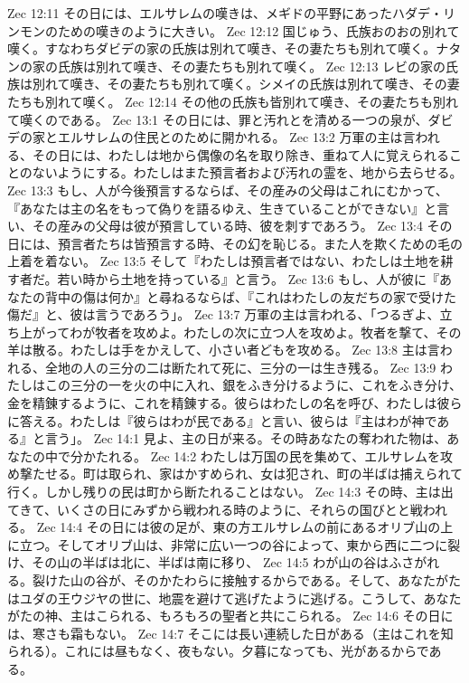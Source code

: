 Zec 12:11  その日には、エルサレムの嘆きは、メギドの平野にあったハダデ・リンモンのための嘆きのように大きい。
Zec 12:12  国じゅう、氏族おのおの別れて嘆く。すなわちダビデの家の氏族は別れて嘆き、その妻たちも別れて嘆く。ナタンの家の氏族は別れて嘆き、その妻たちも別れて嘆く。
Zec 12:13  レビの家の氏族は別れて嘆き、その妻たちも別れて嘆く。シメイの氏族は別れて嘆き、その妻たちも別れて嘆く。
Zec 12:14  その他の氏族も皆別れて嘆き、その妻たちも別れて嘆くのである。
Zec 13:1  その日には、罪と汚れとを清める一つの泉が、ダビデの家とエルサレムの住民とのために開かれる。
Zec 13:2  万軍の主は言われる、その日には、わたしは地から偶像の名を取り除き、重ねて人に覚えられることのないようにする。わたしはまた預言者および汚れの霊を、地から去らせる。
Zec 13:3  もし、人が今後預言するならば、その産みの父母はこれにむかって、『あなたは主の名をもって偽りを語るゆえ、生きていることができない』と言い、その産みの父母は彼が預言している時、彼を刺すであろう。
Zec 13:4  その日には、預言者たちは皆預言する時、その幻を恥じる。また人を欺くための毛の上着を着ない。
Zec 13:5  そして『わたしは預言者ではない、わたしは土地を耕す者だ。若い時から土地を持っている』と言う。
Zec 13:6  もし、人が彼に『あなたの背中の傷は何か』と尋ねるならば、『これはわたしの友だちの家で受けた傷だ』と、彼は言うであろう」。
Zec 13:7  万軍の主は言われる、「つるぎよ、立ち上がってわが牧者を攻めよ。わたしの次に立つ人を攻めよ。牧者を撃て、その羊は散る。わたしは手をかえして、小さい者どもを攻める。
Zec 13:8  主は言われる、全地の人の三分の二は断たれて死に、三分の一は生き残る。
Zec 13:9  わたしはこの三分の一を火の中に入れ、銀をふき分けるように、これをふき分け、金を精錬するように、これを精錬する。彼らはわたしの名を呼び、わたしは彼らに答える。わたしは『彼らはわが民である』と言い、彼らは『主はわが神である』と言う」。
Zec 14:1  見よ、主の日が来る。その時あなたの奪われた物は、あなたの中で分かたれる。
Zec 14:2  わたしは万国の民を集めて、エルサレムを攻め撃たせる。町は取られ、家はかすめられ、女は犯され、町の半ばは捕えられて行く。しかし残りの民は町から断たれることはない。
Zec 14:3  その時、主は出てきて、いくさの日にみずから戦われる時のように、それらの国びとと戦われる。
Zec 14:4  その日には彼の足が、東の方エルサレムの前にあるオリブ山の上に立つ。そしてオリブ山は、非常に広い一つの谷によって、東から西に二つに裂け、その山の半ばは北に、半ばは南に移り、
Zec 14:5  わが山の谷はふさがれる。裂けた山の谷が、そのかたわらに接触するからである。そして、あなたがたはユダの王ウジヤの世に、地震を避けて逃げたように逃げる。こうして、あなたがたの神、主はこられる、もろもろの聖者と共にこられる。
Zec 14:6  その日には、寒さも霜もない。
Zec 14:7  そこには長い連続した日がある（主はこれを知られる）。これには昼もなく、夜もない。夕暮になっても、光があるからである。

